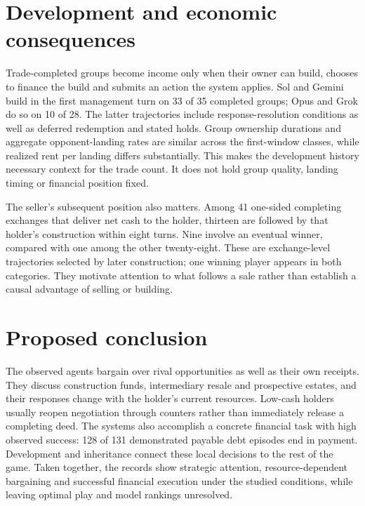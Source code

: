 \section*{Development and economic consequences}

Trade-completed groups become income only when their owner can build, chooses
to finance the build and submits an action the system applies. Sol and Gemini
build in the first management turn on 33 of 35 completed groups; Opus and
Grok do so on 10 of 28. The latter trajectories include response-resolution
conditions as well as deferred redemption and stated holds. Group ownership
durations and aggregate opponent-landing rates are similar across the
first-window classes, while realized rent per landing differs substantially.
This makes the development history necessary context for the trade count.
It does not hold group quality, landing timing or financial position fixed.

The seller's subsequent position also matters. Among 41 one-sided completing
exchanges that deliver net cash to the holder, thirteen are followed by that
holder's construction within eight turns. Nine involve an eventual winner,
compared with one among the other twenty-eight. These are exchange-level
trajectories selected by later construction; one winning player appears in
both categories. They motivate attention to what follows a sale rather than
establish a causal advantage of selling or building.

\section*{Proposed conclusion}

The observed agents bargain over rival opportunities as well as their own
receipts. They discuss construction funds, intermediary resale and prospective
estates, and their responses change with the holder's current resources.
Low-cash holders usually reopen negotiation through counters rather than
immediately release a completing deed. The systems also accomplish a concrete
financial task with high observed success: 128 of 131 demonstrated payable
debt episodes end in payment. Development and inheritance connect these local
decisions to the rest of the game. Taken together, the records show strategic
attention, resource-dependent bargaining and successful financial execution
under the studied conditions, while leaving optimal play and model rankings
unresolved.
